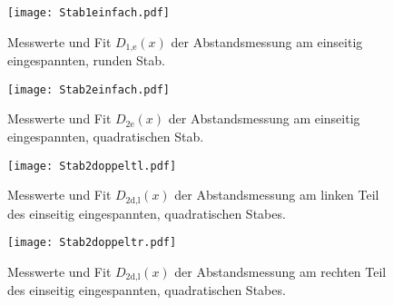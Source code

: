 \begin{figure}
  \centering
  \texttt{[image: Stab1einfach.pdf]}
  \caption{Messwerte und Fit $D_\text{1,e}(x)$ der Abstandsmessung am einseitig
  eingespannten, runden Stab.}
  \label{fig:Stab1einfach}
\end{figure}

\begin{figure}
  \centering
  \texttt{[image: Stab2einfach.pdf]}
  \caption{Messwerte und Fit $D_\text{2e}(x)$ der Abstandsmessung am einseitig
  eingespannten, quadratischen Stab.}
  \label{fig:Stab2einfach}
\end{figure}

\begin{figure}
  \centering
  \texttt{[image: Stab2doppeltl.pdf]}
  \caption{Messwerte und Fit $D_\text{2d,l}(x)$ der Abstandsmessung am
  linken Teil des einseitig eingespannten, quadratischen Stabes.}
  \label{fig:Stab2doppeltlinks}
\end{figure}

\begin{figure}
  \centering
  \texttt{[image: Stab2doppeltr.pdf]}
  \caption{Messwerte und Fit $D_\text{2d,l}(x)$ der Abstandsmessung am
  rechten Teil des einseitig eingespannten, quadratischen Stabes.}
  \label{fig:Stab2doppeltrechts}
\end{figure}

